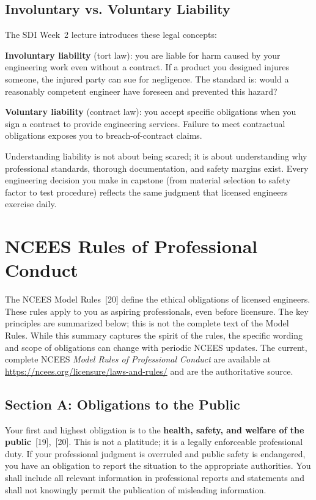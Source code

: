 \subsection{Involuntary vs. Voluntary Liability}
The SDI Week~2 lecture introduces these legal concepts:

\textbf{Involuntary liability} (tort law): you are liable for harm caused by your engineering work even without a contract. If a product you designed injures someone, the injured party can sue for negligence. The standard is: would a reasonably competent engineer have foreseen and prevented this hazard?

\textbf{Voluntary liability} (contract law): you accept specific obligations when you sign a contract to provide engineering services. Failure to meet contractual obligations exposes you to breach-of-contract claims.

Understanding liability is not about being scared; it is about understanding why professional standards, thorough documentation, and safety margins exist. Every engineering decision you make in capstone (from material selection to safety factor to test procedure) reflects the same judgment that licensed engineers exercise daily.

\section{NCEES Rules of Professional Conduct}
The NCEES Model Rules~[20] define the ethical obligations of licensed engineers. These rules apply to you as aspiring professionals, even before licensure. The key principles are summarized below; this is not the complete text of the Model Rules. While this summary captures the spirit of the rules, the specific wording and scope of obligations can change with periodic NCEES updates. The current, complete NCEES \textit{Model Rules of Professional Conduct} are available at \url{https://ncees.org/licensure/laws-and-rules/} and are the authoritative source.

\subsection{Section A: Obligations to the Public}
Your first and highest obligation is to the \textbf{health, safety, and welfare of the public}~[19],~[20]. This is not a platitude; it is a legally enforceable professional duty. If your professional judgment is overruled and public safety is endangered, you have an obligation to report the situation to the appropriate authorities. You shall include all relevant information in professional reports and statements and shall not knowingly permit the publication of misleading information.

